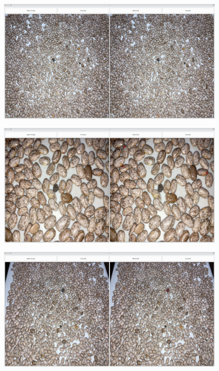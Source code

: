 \documentclass[conference]{IEEEtran}
\begin{document}
    \begin{figure}[H]
        \centering
        \includegraphics[width=\breite\linewidth]{images/test8.png}
        \caption{}
        \label{fig:test8}
    \end{figure}

    \begin{figure}[H]
        \centering
        \includegraphics[width=\breite\linewidth]{images/test9.png}
        \caption{}
        \label{fig:test9}
    \end{figure}

    \begin{figure}[H]
        \centering
        \includegraphics[width=\breite\linewidth]{images/test10.png}
        \caption{}
        \label{fig:test10}
    \end{figure}
\end{document}
